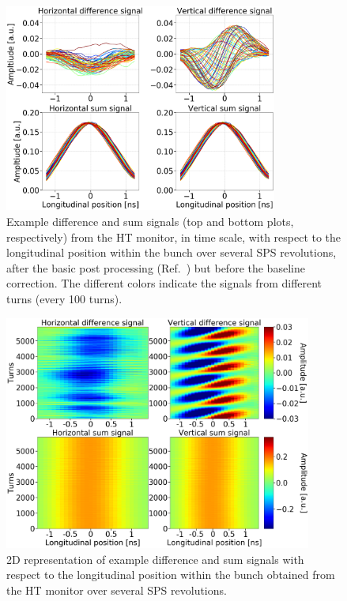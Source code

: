\begin{figure}[!h]
   \centering         
   \includegraphics[width=0.8\textwidth]{images/Ch4/HT_1D__20180530_135105exampleAcq_4thesis_turnsStart0_Stop6000_step100_new.png}
       \caption{Example difference and sum signals (top and bottom plots, respectively) from the HT monitor, in time scale, with respect to the longitudinal position within the bunch over several SPS revolutions, after the basic post processing (Ref.~\cite{Levens:2313358}) but before the baseline correction. The different colors indicate the signals from different turns (every 100 turns). } %
       \label{fig:HT_example_signals}
\end{figure}

\begin{figure}[!h]
   \centering         
   \includegraphics[width=0.9\textwidth]{images/Ch4/HT_2D__20180530_135105_colorbar_new_version.png}
       \caption{2D representation of example difference and sum signals with respect to the longitudinal position within the bunch obtained from the HT monitor over several SPS revolutions.}
       \label{fig:HT_example_signals_2D}
\end{figure}


